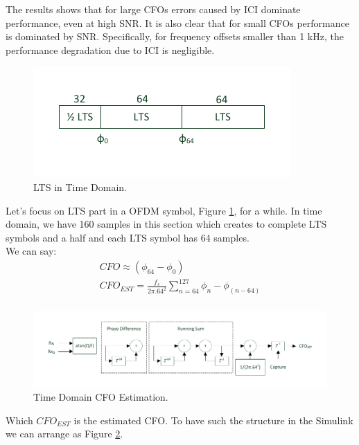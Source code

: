 The results shows that for large CFOs errors caused by ICI dominate performance, even at high SNR. It is also
clear that for small CFOs performance is dominated by SNR. Specifically, for frequency offsets smaller than 1 kHz, the
performance degradation due to ICI is negligible.\\

\begin{figure}[h!]
\centering
\includegraphics{content/fig/lts_time_domain.pdf}
\caption{LTS in Time Domain.}
\label{fig:lts_time_domain}
\end{figure}

Let's focus on LTS part in a OFDM symbol, Figure \ref{fig:lts_time_domain}, for a while. In time domain, we have 160 samples in this section which creates to complete LTS symbols and a half and each LTS symbol has 64 samples.\\

We can say:
\begin{equation} \label{cfo_cal}
\begin{split}
CFO \approx (\phi_{64}- \phi_{0})\\
CFO_{EST} = \frac{f_{s}}{2\pi . 64^{2}} \sum\limits_{n=64}^{127} \phi_{n}- \phi_{(n-64)}\\
\end{split}
\end{equation}


\begin{figure}[h!]
\centering
\includegraphics{content/fig/time_dom_cfo_est.pdf}
\caption{Time Domain CFO Estimation.}
\label{fig:cfo_est}
\end{figure}

Which $CFO_{EST}$ is the estimated CFO. To have such the structure in the Simulink we can arrange as Figure \ref{fig:cfo_est}.

